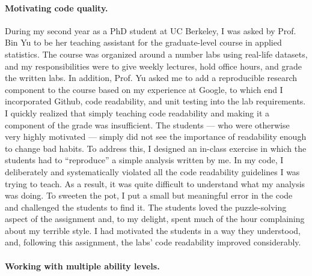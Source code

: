 \paragraph{Motivating code quality.}
%
During my second year as a PhD student at UC Berkeley, I was asked by Prof. Bin
Yu to be her teaching assistant for the graduate-level course in applied
statistics.  The course was organized around a number labs using real-life
datasets, and my responsibilities were to give weekly lectures, hold office hours,
and grade the written labs.  In addition, Prof. Yu asked me to add a
reproducible research component to the course based on my experience at Google,
to which end I incorporated Github, code readability, and unit testing into the
lab requirements.
%
I quickly realized that simply teaching code readability and making it a
component of the grade was insufficient.   The students --- who were otherwise
very highly motivated --- simply did not see the importance of readability
enough to change bad habits.  To address this, I designed an in-class exercise
in which the students had to ``reproduce'' a simple analysis written by me.  In
my code, I deliberately and systematically violated all the code readability
guidelines I was trying to teach.  As a result, it was quite difficult to
understand what my analysis was doing.  To sweeten the pot, I put a small but
meaningful error in the code and challenged the students to find it.  The
students loved the puzzle-solving aspect of the assignment and, to my delight,
spent much of the hour complaining about my terrible style.  I had motivated the
students in a way they understood, and, following this assignment, the labs'
code readability improved considerably.

\paragraph{Working with multiple ability levels.}

